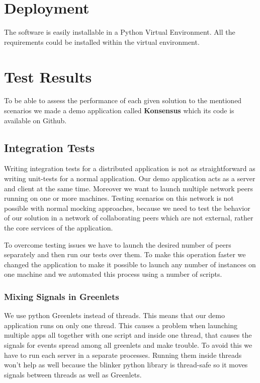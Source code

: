
\section{Deployment}
The software is easily installable in a Python Virtual Environment. 
All the requirements could be installed within the virtual environment.

\section{Test Results}
To be able to assess the performance of each given solution to the mentioned scenarios we made a demo application
called \textbf{Konsensus} which its code is available on Github. \cite{konsensus}

\subsection{Integration Tests}
Writing integration tests for a distributed application is not as straightforward as writing unit-tests for a normal application. 
Our demo application acts as a server and client at the same time. Moreover we want to launch multiple 
network peers running on one or more machines. Testing scenarios on this network is not possible with
normal mocking approaches, because we need to test the behavior of our solution in a network of collaborating
peers which are not external, rather the core services of the application.

To overcome testing issues we have to launch the desired number of peers separately and then run our tests 
over them. To make this operation faster we changed the application to make it possible to launch any number
of instances on one machine and we automated this process using a number of scripts. %

\subsubsection{Mixing Signals in Greenlets}
We use python Greenlets instead of threads. This means that our demo application runs on only one thread. 
This causes a problem when launching multiple apps all together with one script and inside one thread, that
causes the signals for events spread among all greenlets and make trouble. To avoid this we have to run
each server in a separate processes. Running them inside threads won't help as well because the blinker python
library is thread-safe so it moves signals between threads as well as Greenlets.

